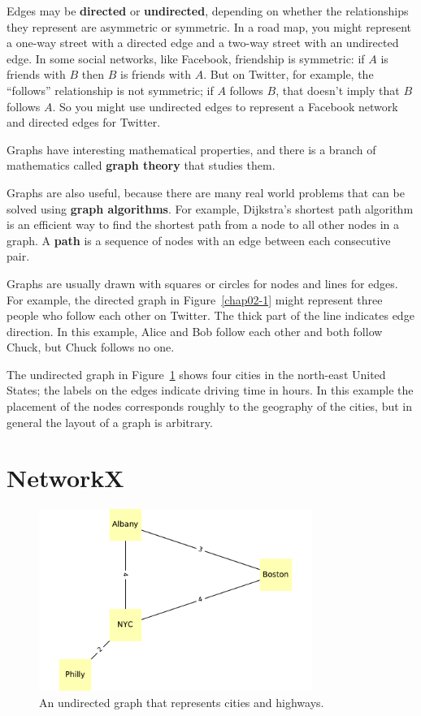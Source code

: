 \documentclass[12pt]{book}
\theoremstyle{exercise}
\begin{document}
Edges may be {\bf directed} or {\bf undirected}, depending on whether
the relationships they represent are asymmetric or symmetric.  In a
road map, you might represent a one-way street with a directed edge
and a two-way street with an undirected edge.  In some social
networks, like Facebook, friendship is symmetric: if $A$ is friends
with $B$ then $B$ is friends with $A$.  But on Twitter, for example,
the ``follows'' relationship is not symmetric; if $A$ follows $B$,
that doesn't imply that $B$ follows $A$.  So you might use undirected
edges to represent a Facebook network and directed edges for Twitter.
 

Graphs have interesting mathematical properties, and
there is a branch of mathematics called {\bf graph theory}
that studies them.

Graphs are also useful, because there are many real world
problems that can be solved using {\bf graph algorithms}.
For example, Dijkstra's shortest path algorithm is an efficient
way to find the shortest path from a node to all
other nodes in a graph.  A {\bf path} is a sequence of nodes
with an edge between each consecutive pair.

Graphs are usually drawn with squares or circles for nodes and lines
for edges.  For example, the directed graph in Figure~\ref{chap02-1}
might represent three people who follow each other on Twitter.
The thick part of the line indicates edge direction.
In this example, Alice and Bob follow each other and both follow
Chuck, but Chuck follows no one.

The undirected graph in Figure~\ref{chap02-2} shows four cities
in the north-east United States; the labels on the edges
indicate driving time in hours.
In this example the placement of the nodes corresponds
roughly to the geography of the cities, but in general the layout
of a graph is arbitrary.


\section{NetworkX}

\begin{figure}
\centerline{\includegraphics[width=3.5in]{figs/chap02-2.pdf}}
\caption{An undirected graph that represents cities and highways.}
\label{chap02-2}
\end{figure}
\end{document}
